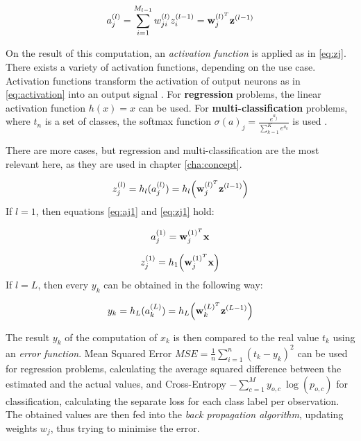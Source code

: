 \begin{equation}\label{eq:activation}
	a_j^{(l)} = \sum_{i=1}^{M_{l-1}}w_{ji}^{(l)}z_i^{(l-1)} = \bold{w}_j^{(l)^T} \bold{z}^{(l-1)}	
\end{equation}

On the result of this computation, an \textit{activation function} is applied as in \ref{eq:zj}. There exists a variety of activation functions, depending on the use case. Activation functions transform the activation of output neurons as in \ref{eq:activation} into an output signal \cite{sibi2013analysis}. For \textbf{regression} problems, the linear activation function $h(x)=x$ can be used. For \textbf{multi-classification} problems, where $t_n$ is a set of classes, the softmax function $\sigma(a)_j= \frac{e^{a_j}}{\sum_{k=1}^Ke^{a_k}}$ is used \cite{hallmachinelearning}.

There are more cases, but regression and multi-classification are the most relevant here, as they are used in chapter \ref{cha:concept}.

\begin{equation} \label{eq:zj}
	z_j^{(l)} = h_l(a_j^{(l)}) = h_l\Big(\bold{w}_j^{(l)^T} \bold{z}^{(l-1)}\Big)	
\end{equation}
If $l=1$, then equations \ref{eq:aj1} and \ref{eq:zj1} hold:

\begin{equation} \label{eq:aj1}
	a_j^{(1)}=\bold{w}_j^{(1)^T}\bold{x}
\end{equation}

\begin{equation} \label{eq:zj1}
	z_j^{(1)}=h_1\Big(\bold{w}_j^{(1)^T}\bold{x}\Big)
\end{equation}
If $l=L$, then every $y_k$ can be obtained in the following way:

\begin{equation}
	y_k = h_L(a_k^{(L)}) = h_L\Big( \bold{w}_k^{(L)^T} \bold{z}^{(L-1)} \Big)
\end{equation}

The result $y_k$ of the computation of $x_k$ is then compared to the real value $t_k$ using an \textit{error function}. Mean Squared Error $MSE = \frac{1}{n} \sum_{i=1}^n (t_k-y_k)^2$ can be used for regression problems, calculating the average squared difference between the estimated and the actual values, and Cross-Entropy $-\sum_{c=1}^My_{o,c} \: \log(p_{o,c})$ for classification, calculating the separate loss for each class label per observation. The obtained values are then fed into the \textit{back propagation algorithm}, updating weights $w_j$, thus trying to minimise the error. 



